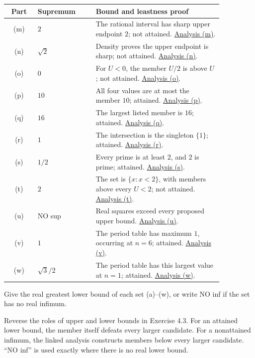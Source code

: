 \begin{center}
\begin{tabular}{@{}c@{\quad}p{0.27\linewidth}@{\quad}p{0.59\linewidth}@{}}
\toprule
Part&Supremum&Bound and leastness proof\\ \midrule
(m)&$2$&The rational interval has sharp upper endpoint $2$; not attained. \hyperref[bounds:m]{Analysis (m)}.\\
(n)&$\sqrt2$&Density proves the upper endpoint is sharp; not attained. \hyperref[bounds:n]{Analysis (n)}.\\
(o)&$0$&For $U<0$, the member $U/2$ is above $U$; not attained. \hyperref[bounds:o]{Analysis (o)}.\\
(p)&$10$&All four values are at most the member $10$; attained. \hyperref[bounds:p]{Analysis (p)}.\\
(q)&$16$&The largest listed member is $16$; attained. \hyperref[bounds:q]{Analysis (q)}.\\
(r)&$1$&The intersection is the singleton $\{1\}$; attained. \hyperref[bounds:r]{Analysis (r)}.\\
(s)&$1/2$&Every prime is at least $2$, and $2$ is prime; attained. \hyperref[bounds:s]{Analysis (s)}.\\
(t)&$2$&The set is $\{x:x<2\}$, with members above every $U<2$; not attained. \hyperref[bounds:t]{Analysis (t)}.\\
(u)&NO sup&Real squares exceed every proposed upper bound. \hyperref[bounds:u]{Analysis (u)}.\\
(v)&$1$&The period table has maximum $1$, occurring at $n=6$; attained. \hyperref[bounds:v]{Analysis (v)}.\\
(w)&$\sqrt3/2$&The period table has this largest value at $n=1$; attained. \hyperref[bounds:w]{Analysis (w)}.\\
\bottomrule
\end{tabular}
\end{center}



\goal Give the real greatest lower bound of each set (a)--(w),
or write NO inf if the set has no real infimum.

\idea Reverse the roles of upper and lower bounds in Exercise 4.3.
For an attained lower bound, the member itself defeats every larger
candidate. For a nonattained infimum, the linked analysis constructs
members below every larger candidate. ``NO inf'' is used exactly
where there is no real lower bound.


